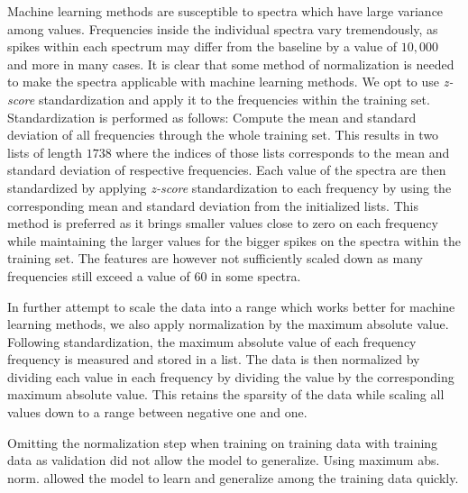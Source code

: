 Machine learning methods are susceptible to spectra which have large variance among values. Frequencies inside the individual spectra vary tremendously, as spikes within each spectrum may differ from the baseline by a value of $10,000$ and more in many cases. It is clear that some method of normalization is needed to make the spectra applicable with machine learning methods. We opt to use \textit{z-score} standardization and apply it to the frequencies within the training set. Standardization is performed as follows: Compute the mean and standard deviation of all frequencies through the whole training set. This results in two lists of length $1738$ where the indices of those lists corresponds to the mean and standard deviation of respective frequencies. Each value of the spectra are then standardized by applying \textit{z-score} standardization to each frequency by using the corresponding mean and standard deviation from the initialized lists. This method is preferred as it brings smaller values close to zero on each frequency while maintaining the larger values for the bigger spikes on the spectra within the training set. The features are however not sufficiently scaled down as many frequencies still exceed a value of $60$ in some spectra.

In further attempt to scale the data into a range which works better for machine learning methods, we also apply normalization by the maximum absolute value. Following standardization, the maximum absolute value of each frequency frequency is measured and stored in a list. The data is then normalized by dividing each value in each frequency by dividing the value by the corresponding maximum absolute value. This retains the sparsity of the data while scaling all values down to a range between negative one and one.


Omitting the normalization step when training on training data with training data as validation did not allow the model to generalize. Using maximum abs. norm. allowed the model to learn and generalize among the training data quickly.